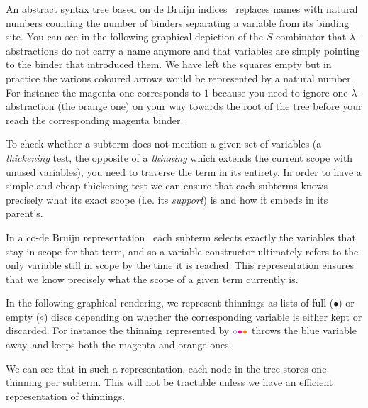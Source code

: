 An abstract syntax tree based on de Bruijn indices~\cite{MANUAL:journals/math/debruijn72}
replaces names with natural numbers counting the number of binders separating a variable
from its binding site.
%
You can see in the following graphical depiction of the $S$ combinator that
$\lambda$-abstractions do not carry a name anymore and that variables are simply pointing
to the binder that introduced them. We have left the squares empty but in practice
the various coloured arrows would be represented by a natural number.
%
For instance the {\color{magenta}magenta} one corresponds to $1$ because you need
to ignore one $\lambda{}$-abstraction (the {\color{orange}orange} one) on your way
towards the root of the tree before your reach the corresponding magenta binder.


To check whether a subterm does not mention a given set of variables
(a \emph{thickening} test, the opposite of a \emph{thinning} which extends the
current scope with unused variables), you need to traverse the term in its entirety.
%
In order to have a simple and cheap thickening test we can ensure that each subterms
knows precisely what its exact scope (i.e. its \emph{support}) is and how it embeds
in its parent's.

In a co-de Bruijn
representation~\cite{DBLP:journals/corr/abs-1807-04085} each subterm
selects exactly the variables that stay in scope for that term,
and so a variable constructor ultimately refers to the only variable still
in scope by the time it is reached.
%
This representation ensures that we know precisely what the scope of a given term
currently is.

In the following graphical rendering, we represent thinnings as lists of full
($\bullet$) or empty ($\circ$) discs depending on whether the corresponding
variable is either kept or discarded.
For instance the thinning represented by
$\color{blue}{\circ}\color{magenta}{\bullet}\color{orange}{\bullet}$
throws the {\color{blue}blue} variable away, and keeps both the
{\color{magenta}magenta} and {\color{orange}orange} ones.


We can see that in such a representation, each node in the tree stores one
thinning per subterm. This will not be tractable unless we have an efficient
representation of thinnings.


